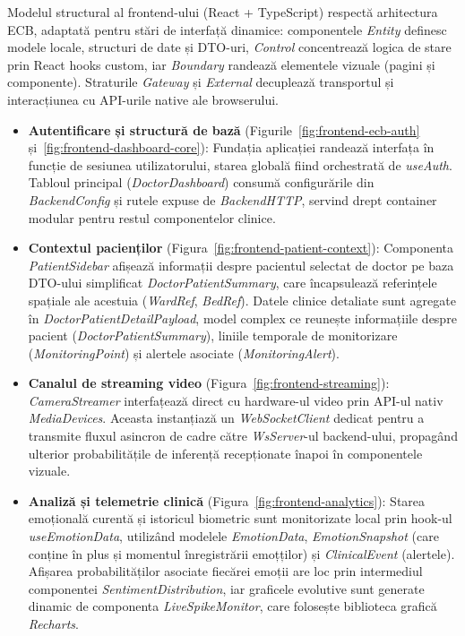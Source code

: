 Modelul structural al frontend-ului (React + TypeScript) respectă arhitectura ECB, adaptată pentru stări de interfață dinamice: componentele \textit{Entity} definesc modele locale, structuri de date și DTO-uri, \textit{Control} concentrează logica de stare prin React hooks custom, iar \textit{Boundary} randează elementele vizuale (pagini și componente). Straturile \textit{Gateway} și \textit{External} decuplează transportul și interacțiunea cu API-urile native ale browserului.

\begin{itemize}
	\item \textbf{Autentificare și structură de bază} (Figurile~\ref{fig:frontend-ecb-auth} și~\ref{fig:frontend-dashboard-core}): Fundația aplicației randează interfața în funcție de sesiunea utilizatorului, starea globală fiind orchestrată de \textit{useAuth}. Tabloul principal (\textit{DoctorDashboard}) consumă configurările din \textit{BackendConfig} și rutele expuse de \textit{BackendHTTP}, servind drept container modular pentru restul componentelor clinice.
	
	\item \textbf{Contextul pacienților} (Figura~\ref{fig:frontend-patient-context}): Componenta \textit{PatientSidebar} afișează in\-for\-ma\-ții despre pacientul selectat de doctor pe baza DTO-ului simplificat \textit{DoctorPatientSummary}, care încapsulează referințele spațiale ale acestuia (\textit{WardRef}, \textit{BedRef}). Datele clinice detaliate sunt agregate în \textit{DoctorPatientDetailPayload}, model complex ce reunește informațiile despre pacient (\textit{DoctorPatientSummary}), liniile temporale de monitorizare (\textit{MonitoringPoint}) și alertele asociate (\textit{MonitoringAlert}).
	
	\item \textbf{Canalul de streaming video} (Figura~\ref{fig:frontend-streaming}): \textit{CameraStreamer} interfațează direct cu hardware-ul video prin API-ul nativ \textit{MediaDevices}. Aceasta instanțiază un \textit{WebSocketClient} dedicat pentru a transmite fluxul asincron de cadre către \textit{WsServer}-ul backend-ului, propagând ulterior probabilitățile de inferență re\-cep\-ți\-o\-na\-te înapoi în componentele vizuale.
	
	\item \textbf{Analiză și telemetrie clinică} (Figura~\ref{fig:frontend-analytics}): Starea emoțională curentă și istoricul biometric sunt monitorizate local prin hook-ul \textit{useEmotionData}, utilizând modelele \textit{EmotionData}, \textit{EmotionSnapshot} (care conține în plus și momentul în\-re\-gis\-tră\-rii emoțților) și \textit{ClinicalEvent} (alertele). Afișarea probabilităților asociate fiecărei emoții are loc prin intermediul componentei \textit{SentimentDistribution}, iar graficele evolutive sunt generate dinamic de componenta \textit{LiveSpikeMonitor}, care folosește biblioteca grafică \textit{Recharts}.
	

\end{itemize}
